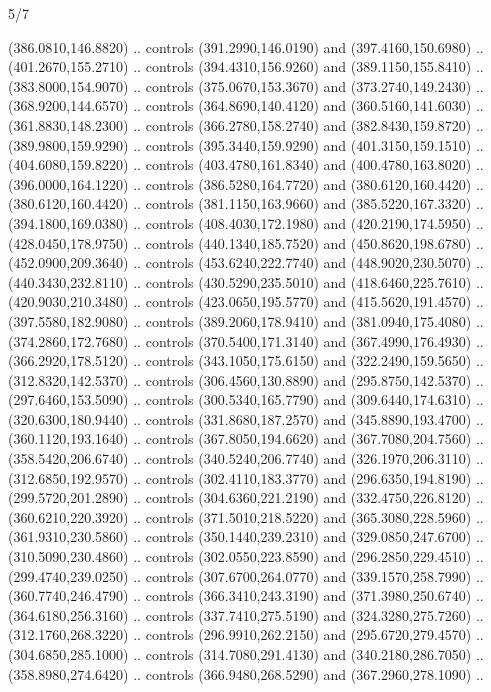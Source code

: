 \begin{flagdescription}{5/7}
\begin{scope}[xshift=0.5\flaglength]
\begin{scope}[scale=0.0019\flagwidth,yshift=190.5mm,xshift=-137.7mm]
\begin{scope}[y=0.80pt, x=0.80pt, yscale=-1, xscale=1, inner sep=0pt, outer sep=0pt]
  (386.0810,146.8820) .. controls (391.2990,146.0190) and (397.4160,150.6980) ..
  (401.2670,155.2710) .. controls (394.4310,156.9260) and (389.1150,155.8410) ..
  (383.8000,154.9070) .. controls (375.0670,153.3670) and (373.2740,149.2430) ..
  (368.9200,144.6570) .. controls (364.8690,140.4120) and (360.5160,141.6030) ..
  (361.8830,148.2300) .. controls (366.2780,158.2740) and (382.8430,159.8720) ..
  (389.9800,159.9290) .. controls (395.3440,159.9290) and (401.3150,159.1510) ..
  (404.6080,159.8220) .. controls (403.4780,161.8340) and (400.4780,163.8020) ..
  (396.0000,164.1220) .. controls (386.5280,164.7720) and (380.6120,160.4420) ..
  (380.6120,160.4420) .. controls (381.1150,163.9660) and (385.5220,167.3320) ..
  (394.1800,169.0380) .. controls (408.4030,172.1980) and (420.2190,174.5950) ..
  (428.0450,178.9750) .. controls (440.1340,185.7520) and (450.8620,198.6780) ..
  (452.0900,209.3640) .. controls (453.6240,222.7740) and (448.9020,230.5070) ..
  (440.3430,232.8110) .. controls (430.5290,235.5010) and (418.6460,225.7610) ..
  (420.9030,210.3480) .. controls (423.0650,195.5770) and (415.5620,191.4570) ..
  (397.5580,182.9080) .. controls (389.2060,178.9410) and (381.0940,175.4080) ..
  (374.2860,172.7680) .. controls (370.5400,171.3140) and (367.4990,176.4930) ..
  (366.2920,178.5120) .. controls (343.1050,175.6150) and (322.2490,159.5650) ..
  (312.8320,142.5370) .. controls (306.4560,130.8890) and (295.8750,142.5370) ..
  (297.6460,153.5090) .. controls (300.5340,165.7790) and (309.6440,174.6310) ..
  (320.6300,180.9440) .. controls (331.8680,187.2570) and (345.8890,193.4700) ..
  (360.1120,193.1640) .. controls (367.8050,194.6620) and (367.7080,204.7560) ..
  (358.5420,206.6740) .. controls (340.5240,206.7740) and (326.1970,206.3110) ..
  (312.6850,192.9570) .. controls (302.4110,183.3770) and (296.6350,194.8190) ..
  (299.5720,201.2890) .. controls (304.6360,221.2190) and (332.4750,226.8120) ..
  (360.6210,220.3920) .. controls (371.5010,218.5220) and (365.3080,228.5960) ..
  (361.9310,230.5860) .. controls (350.1440,239.2310) and (329.0850,247.6700) ..
  (310.5090,230.4860) .. controls (302.0550,223.8590) and (296.2850,229.4510) ..
  (299.4740,239.0250) .. controls (307.6700,264.0770) and (339.1570,258.7990) ..
  (360.7740,246.4790) .. controls (366.3410,243.3190) and (371.3980,250.6740) ..
  (364.6180,256.3160) .. controls (337.7410,275.5190) and (324.3280,275.7260) ..
  (312.1760,268.3220) .. controls (296.9910,262.2150) and (295.6720,279.4570) ..
  (304.6850,285.1000) .. controls (314.7080,291.4130) and (340.2180,286.7050) ..
  (358.8980,274.6420) .. controls (366.9480,268.5290) and (367.2960,278.1090) ..

\end{scope}
\end{scope}
\end{scope}
\end{flagdescription}
